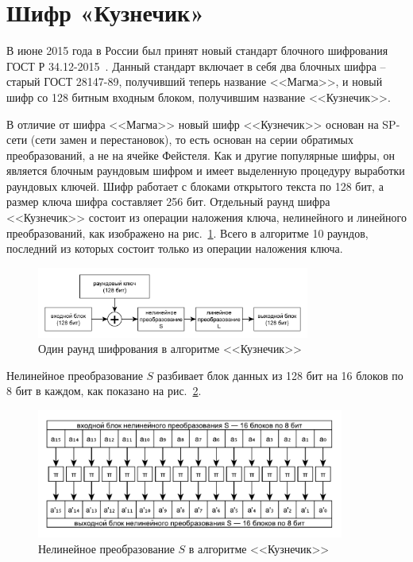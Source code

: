 \section{Шифр «Кузнечик»}\label{section-grig}

В июне 2015 года в России был принят новый стандарт блочного шифрования ГОСТ Р 34.12-2015~\cite{GOST-R:34.12-2015}. Данный стандарт включает в себя два блочных шифра -- старый ГОСТ 28147-89, получивший теперь название <<Магма>>, и новый шифр со 128 битным входным блоком, получившим название <<Кузнечик>>.

В отличие от шифра <<Магма>> новый шифр <<Кузнечик>> основан на SP-сети (сети замен и перестановок), то есть основан на серии обратимых преобразований, а не на ячейке Фейстеля. Как и другие популярные шифры, он является блочным раундовым шифром и имеет выделенную процедуру выработки раундовых ключей. Шифр работает с блоками открытого текста по 128 бит, а размер ключа шифра составляет 256 бит. Отдельный раунд шифра <<Кузнечик>> состоит из операции наложения ключа, нелинейного и линейного преобразований, как изображено на рис.~\ref{fig:kuznechik-step}. Всего в алгоритме 10 раундов, последний из которых состоит только из операции наложения ключа. 

\begin{figure}[htb]
	\centering
	\includegraphics[width=0.8\textwidth]{pic/kuznechik-step}
  \caption{Один раунд шифрования в алгоритме <<Кузнечик>>}
  \label{fig:kuznechik-step}
\end{figure}

Нелинейное преобразование $S$ разбивает блок данных из 128 бит на 16 блоков по 8 бит в каждом, как показано на рис.~\ref{fig:kuznechik-s}.

\begin{figure}[htb]
	\centering
	\includegraphics[width=0.9\textwidth]{pic/kuznechik-s}
  \caption{Нелинейное преобразование $S$ в алгоритме <<Кузнечик>>}
  \label{fig:kuznechik-s}
\end{figure}

